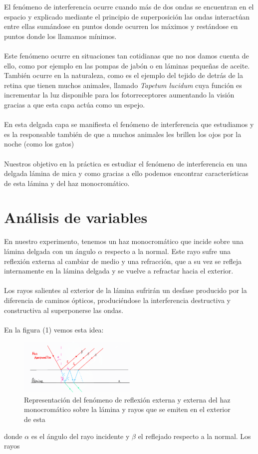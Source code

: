 \documentclass[11pt,letterpaper,twocolumn]{article}
\begin{document}
El fenómeno de interferencia ocurre cuando más de dos ondas se encuentran en el espacio y explicado mediante el principio de superposición las ondas interactúan entre ellas sumándose en puntos donde ocurren los máximos y restándose en puntos donde los llamamos mínimos.\\
\\
Este fenómeno ocurre en situaciones tan cotidianas que no nos damos cuenta de ello, como por ejemplo en las pompas de jabón o en láminas pequeñas de aceite. También ocurre en la naturaleza, como es el ejemplo del tejido de detrás de la retina que tienen muchos animales, llamado \textit{Tapetum lucidum} cuya función es incrementar la luz disponible para los fotorreceptores aumentando la visión gracias a que esta capa actúa como un espejo. \\
\\
En esta delgada capa se manifiesta el fenómeno de interferencia que estudiamos y es la responsable también de que a muchos animales les brillen los ojos por la noche (como los gatos) \textcolor{blue}{\cite{tapetum}}\\
\\
Nuestros objetivo en la práctica es estudiar el fenómeno de interferencia en una delgada lámina de mica y como gracias a ello podemos encontrar características de esta lámina y del haz monocromático.
\section{Análisis de variables}%
En nuestro experimento, tenemos un haz monocromático que incide sobre una lámina delgada con un ángulo $\alpha$ respecto a la normal. Este rayo sufre una reflexión externa al cambiar de medio y una refracción, que a su vez se refleja internamente en la lámina delgada y se vuelve a refractar hacia el exterior. \\
\\
Los rayos salientes al exterior de la lámina sufrirán un desfase producido por la diferencia de caminos ópticos, produciéndose la interferencia destructiva y constructiva al superponerse las ondas.\\
\\
En la figura (1) vemos esta idea: 
\begin{figure}[H]
	\centering
	\includegraphics[width=0.5\textwidth]{imagen/diagramalamina.png}
	\caption{\small Representación del fenómeno de reflexión externa y externa del haz monocromático sobre la lámina y rayos que se emiten en el exterior de esta}
\end{figure}
donde $\alpha$ es el ángulo del rayo incidente y $\beta$ el reflejado respecto a la normal. Los rayos 
\\
\end{document}
